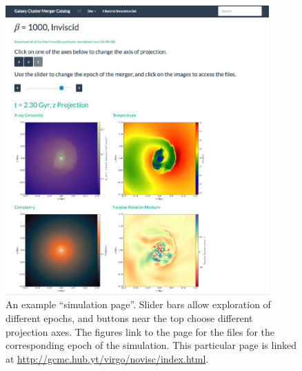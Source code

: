 \documentclass{emulateapj}
\begin{document}
\begin{figure}
\begin{center}
\includegraphics[width=0.9\textwidth]{sim_page.eps}
\caption{An example ``simulation page''. Slider bars allow exploration of different epochs, and buttons near the top choose different projection axes. The figures link to the page for the files for the corresponding epoch of the simulation. This particular page is linked at \url{http://gcmc.hub.yt/virgo/novisc/index.html}.}
\end{center}
\end{figure}
\end{document}
